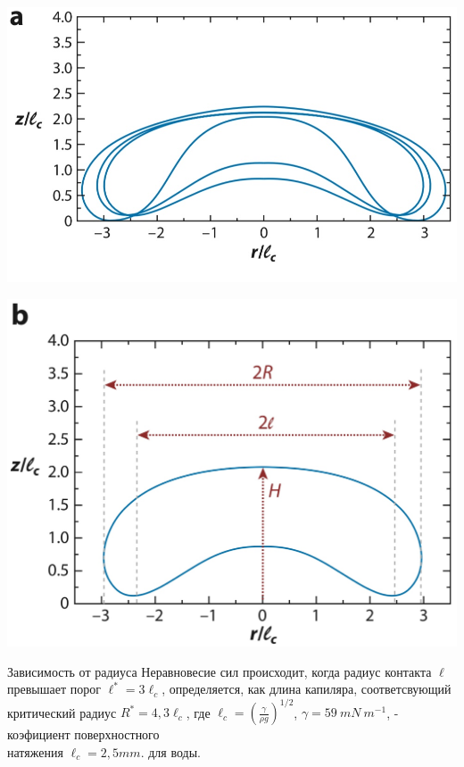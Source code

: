 \begin{frame}{}
  \begin{minipage}[h]{0.49\linewidth}
{\includegraphics[width=\linewidth]{tex/conclusao/IMG_7593.jpg}}
\label{fig:image}
\end{minipage}
\begin{minipage}[h]{0.49\linewidth}
{\includegraphics[width=\linewidth]{tex/conclusao/IMG_7592.jpg}}
\end{minipage}
\begin{block}{Зависимость от радиуса}
 Неравновесие сил происходит, когда радиус контакта \(\ell\) превышает порог \(\ell^{*} = 3\ell_{c}\), определяется, как длина капиляра, соответсвующий критический радиус \(R^{*}=4,3\ell_{c} \), где
 \({\ell_{c}=\left(\frac{\gamma}{\rho g}\right)}^{1/2}\), \(\gamma=59\ mN\ m^{-1}\), - коэфициент поверхностного \\
 \vspace{0.10cm}
 натяжения \(\ell_{c}=2,5 mm.\) для воды.
 \end{block}
\end{frame}

